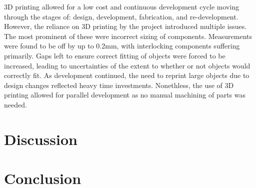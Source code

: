 \documentclass[11pt]{article} %
\begin{document}
3D printing allowed for a low cost and continuous development cycle moving through the stages of: design, development, fabrication, and re-development. However, the reliance on 3D printing by the project introduced multiple issues. The most prominent of these were incorrect sizing of components. Measurements were found to be off by up to 0.2mm, with interlocking components suffering primarily. Gaps left to ensure correct fitting of objects were forced to be increased, leading to uncertainties of the extent to whether or not objects would correctly fit. As development continued, the need to reprint large objects due to design changes reflected heavy time investments.
Nonethless, the use of 3D printing allowed for parallel development as no manual machining of parts was needed.



\section{Discussion}
\section{Conclusion}


\end{document}
